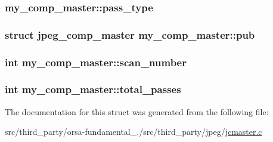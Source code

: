 \subsubsection[{pass\+\_\+type}]{ my\+\_\+comp\+\_\+master\+::pass\+\_\+type}\label{structmy__comp__master_ab153ff271327de71553b428d057e991b}
\hypertarget{structmy__comp__master_a92f91e2f4b79fd0e6ae36f24d8f455f0}{}
\subsubsection[{pub}]{\setlength{\rightskip}{0pt plus 5cm}struct {\bf jpeg\+\_\+comp\+\_\+master} my\+\_\+comp\+\_\+master\+::pub}\label{structmy__comp__master_a92f91e2f4b79fd0e6ae36f24d8f455f0}
\hypertarget{structmy__comp__master_a85aabce3d888eccfaf21eeb8c5cc8606}{}
\subsubsection[{scan\+\_\+number}]{\setlength{\rightskip}{0pt plus 5cm}int my\+\_\+comp\+\_\+master\+::scan\+\_\+number}\label{structmy__comp__master_a85aabce3d888eccfaf21eeb8c5cc8606}
\hypertarget{structmy__comp__master_abc21ff7e11e64247ad8ff68ad819e9fc}{}
\subsubsection[{total\+\_\+passes}]{\setlength{\rightskip}{0pt plus 5cm}int my\+\_\+comp\+\_\+master\+::total\+\_\+passes}\label{structmy__comp__master_abc21ff7e11e64247ad8ff68ad819e9fc}


The documentation for this struct was generated from the following file\+:\begin{DoxyCompactItemize}
\item 
src/third\+\_\+party/orsa-\/fundamental\+\_./src/third\+\_\+party/jpeg/\hyperlink{jcmaster_8c}{jcmaster.\+c}\end{DoxyCompactItemize}
